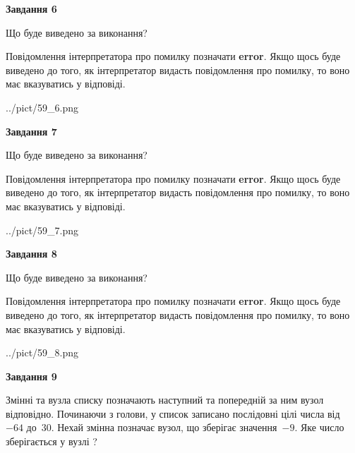 \documentclass[12pt, ukrainian]{article}
\begin{document}
{\begin {large}
{\begin {center}\textbf{Завдання 6}\end {center}}\par
Що буде виведено за виконання?

Повідомлення інтерпретатора про помилку позначати \textbf{error}.
Якщо щось буде виведено до того, як інтерпретатор видасть повідомлення про помилку, 
то воно має вказуватись у відповіді. \par


\begin{center}
	{../pict/59_6.png}
\end{center}
\newpage

{\begin {center}\textbf{Завдання 7}\end {center}}\par
Що буде виведено за виконання?

Повідомлення інтерпретатора про помилку позначати \textbf{error}.
Якщо щось буде виведено до того, як інтерпретатор видасть повідомлення про помилку, 
то воно має вказуватись у відповіді. \par


\begin{center}
	{../pict/59_7.png}
\end{center}
\newpage

{\begin {center}\textbf{Завдання 8}\end {center}}\par
Що буде виведено за виконання?

Повідомлення інтерпретатора про помилку позначати \textbf{error}.
Якщо щось буде виведено до того, як інтерпретатор видасть повідомлення про помилку, 
то воно має вказуватись у відповіді. \par


\begin{center}
	{../pict/59_8.png}
\end{center}
\newpage

{\begin {center}\textbf{Завдання 9}\end {center}}\par
Змінні  та  вузла списку позначають наступний та попередній за ним вузол відповідно. Починаючи з голови, у список записано послідовні цілі числа від~$-64$ до~$30$. Нехай змінна  позначає вузол, що зберігає значення~$-9$.
Яке число зберігається у вузлі  ?\par
\newpage


\end{large}}
\end{document}
